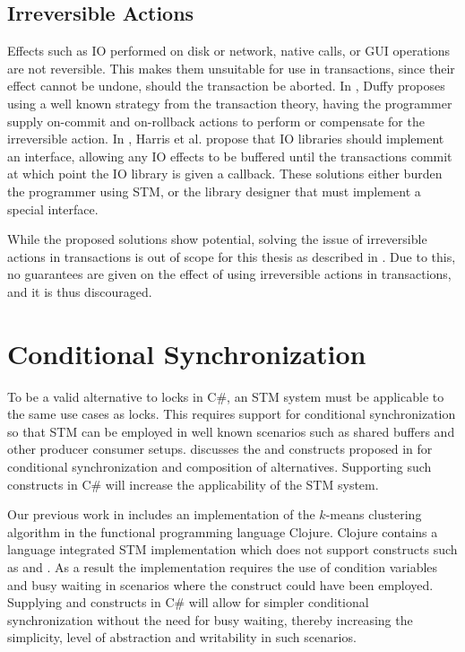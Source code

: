 \subsection{Irreversible Actions}\label{subsec:irreversible}
Effects such as \ac{IO} performed on disk or network, native calls, or GUI operations are not reversible. This makes them unsuitable for use in transactions, since their effect cannot be undone, should the transaction be aborted. In \cite{duffy2010stmnet}, Duffy proposes using a well known strategy from the transaction theory\cite{reuter1993transaction}, having the programmer supply on-commit and on-rollback actions to perform or compensate for the irreversible action. In \cite{harris2005exceptions}, Harris et al. propose that \ac{IO} libraries should implement an interface, allowing any \ac{IO} effects to be buffered until the transactions commit at which point the \ac{IO} library is given a callback. These solutions either burden the programmer using \ac{STM}, or the library designer that must implement a special interface.

While the proposed solutions show potential, solving the issue of irreversible actions in transactions is out of scope for this thesis as described in . Due to this, no guarantees are given on the effect of using irreversible actions in transactions, and it is thus discouraged.

\section{Conditional Synchronization}
\label{sec:req_conditional}
To be a valid alternative to locks in C\#, an \ac{STM} system must be applicable to the same use cases as locks. This requires support for conditional synchronization so that \ac{STM} can be employed in well known scenarios such as shared buffers and other producer consumer setups\cite[p. 128]{tanenbaum2008modern}.  discusses the  and  constructs proposed in \cite{harris2005composable} for conditional synchronization and composition of alternatives. Supporting such constructs in C\# will increase the applicability of the \ac{STM} system.

Our previous work in \cite{dpt907e14trending} includes an implementation of the $k$-means clustering algorithm\cite[p. 451]{dataminingconceptsandtechniques} in the functional programming language Clojure. Clojure contains a language integrated \ac{STM} implementation which does not support constructs such as  and . As a result the implementation requires the use of condition variables and busy waiting in scenarios where the  construct could have been employed\cite{duffy2010stmnet}. Supplying  and  constructs in C\# will allow for simpler conditional synchronization without the need for busy waiting, thereby increasing the simplicity, level of abstraction and writability in such scenarios. 

